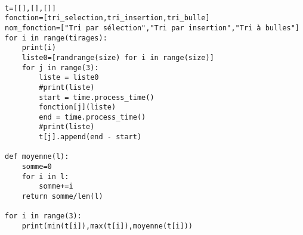 \begin{solution}~\\
\vspace{-0.7cm}
\begin{verbatim}
t=[[],[],[]]
fonction=[tri_selection,tri_insertion,tri_bulle]
nom_fonction=["Tri par sélection","Tri par insertion","Tri à bulles"]
for i in range(tirages):
    print(i)
    liste0=[randrange(size) for i in range(size)]
    for j in range(3):
        liste = liste0
        #print(liste)
        start = time.process_time()
        fonction[j](liste) 
        end = time.process_time()
        #print(liste)
        t[j].append(end - start)
        
def moyenne(l):
    somme=0
    for i in l:
        somme+=i
    return somme/len(l)

for i in range(3):
    print(min(t[i]),max(t[i]),moyenne(t[i]))
\end{verbatim}    
\end{solution}





















